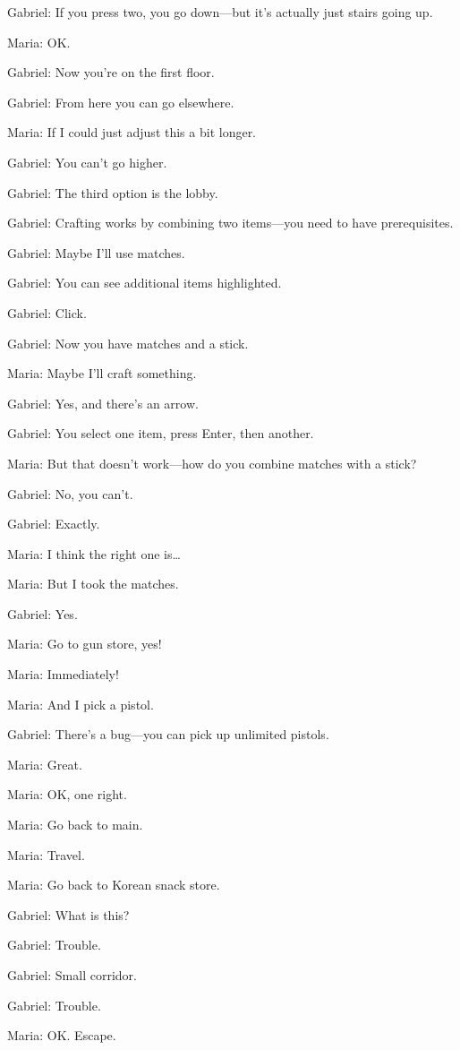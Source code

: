 Gabriel: If you press two, you go down—but it’s actually just stairs going up.

Maria: OK.

Gabriel: Now you’re on the first floor.

Gabriel: From here you can go elsewhere.

Maria: If I could just adjust this a bit longer.

Gabriel: You can’t go higher.

Gabriel: The third option is the lobby.

Gabriel: Crafting works by combining two items—you need to have prerequisites.

Gabriel: Maybe I’ll use matches.

Gabriel: You can see additional items highlighted.

Gabriel: Click.

Gabriel: Now you have matches and a stick.

Maria: Maybe I’ll craft something.

Gabriel: Yes, and there’s an arrow.

Gabriel: You select one item, press Enter, then another.

Maria: But that doesn’t work—how do you combine matches with a stick?

Gabriel: No, you can’t.

Gabriel: Exactly.

Maria: I think the right one is…

Maria: But I took the matches.

Gabriel: Yes.

Maria: Go to gun store, yes!

Maria: Immediately!

Maria: And I pick a pistol.

Gabriel: There’s a bug—you can pick up unlimited pistols.

Maria: Great.

Maria: OK, one right.

Maria: Go back to main.

Maria: Travel.

Maria: Go back to Korean snack store.

Gabriel: What is this?

Gabriel: Trouble.

Gabriel: Small corridor.

Gabriel: Trouble.

Maria: OK. Escape.

